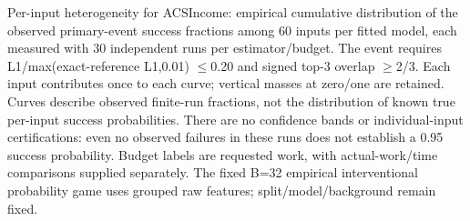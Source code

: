 Per-input heterogeneity for ACSIncome: empirical cumulative distribution of the observed primary-event success fractions among 60 inputs per fitted model, each measured with 30 independent runs per estimator/budget. The event requires L1/max(exact-reference L1,0.01) $\leq$0.20 and signed top-3 overlap $\geq$2/3. Each input contributes once to each curve; vertical masses at zero/one are retained. Curves describe observed finite-run fractions, not the distribution of known true per-input success probabilities. There are no confidence bands or individual-input certifications: even no observed failures in these runs does not establish a 0.95 success probability. Budget labels are requested work, with actual-work/time comparisons supplied separately. The fixed B=32 empirical interventional probability game uses grouped raw features; split/model/background remain fixed.
